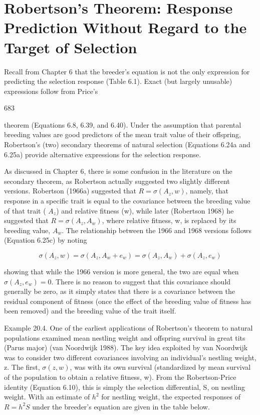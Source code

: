 \documentclass{article}
\begin{document}
\section{Robertson's Theorem: Response Prediction Without Regard to the Target of Selection}
Recall from Chapter 6 that the breeder’s equation is not the only expression for predicting the selection response (Table 6.1). Exact (but largely unusable) expressions follow from Price’s

683

theorem (Equations 6.8, 6.39, and 6.40). Under the assumption that parental breeding values are good predictors of the mean trait value of their offspring, Robertson’s (two) secondary theorems of natural selection (Equations 6.24a and 6.25a) provide alternative expressions for the selection response.

As discussed in Chapter 6, there is some confusion in the literature on the secondary theorem, as Robertson actually suggested two slightly different versions. Robertson (1966a) suggested that  $ R = \sigma(A_z, w) $, namely, that response in a specific trait is equal to the covariance between the breeding value of that trait ( $ A_z $) and relative fitness (w), while later (Robertson 1968) he suggested that  $ R = \sigma(A_z, A_w) $, where relative fitness, w, is replaced by its breeding value,  $ A_w $. The relationship between the 1966 and 1968 versions follows (Equation 6.25c) by noting

\begin{equation}
\sigma(A_{z},w)=\sigma(A_{z},A_{w}+e_{w})=\sigma(A_{z},A_{w})+\sigma(A_{z},e_{w})
\end{equation}

showing that while the 1966 version is more general, the two are equal when  $ \sigma(A_{z}, e_{w}) = 0 $. There is no reason to suggest that this covariance should generally be zero, as it simply states that there is a covariance between the residual component of fitness (once the effect of the breeding value of fitness has been removed) and the breeding value of the trait itself.

Example 20.4. One of the earliest applications of Robertson’s theorem to natural populations examined mean nestling weight and offspring survival in great tits (Parus major) (van Noordwijk 1988). The key idea exploited by van Noordwijk was to consider two different covariances involving an individual’s nestling weight, z. The first,  $ \sigma(z, w) $, was with its own survival (standardized by mean survival of the population to obtain a relative fitness, w). From the Robertson-Price identity (Equation 6.10), this is simply the selection differential, S, on nestling weight. With an estimate of  $ h^2 $ for nestling weight, the expected responses of  $ R = h^2 S $ under the breeder’s equation are given in the table below.
\end{document}
